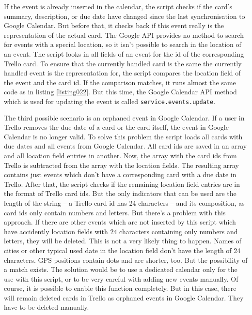 If the event is already inserted in the calendar, the script checks if the card's summary, description, or due date have changed since the last synchronisation to Google Calendar. But before that, it checks back if this event really is the representation of the actual card. The Google API provides no method to search for events with a special location, so it isn't possible to search in the location of an event. The script looks in all fields of an event for the id of the corresponding Trello card. To ensure that the currently handled card is the same the currently handled event is the representation for, the script compares the location field of the event and the card id. If the comparison matches, it runs almost the same code as in listing \ref{listing022}. But this time, the Google Calendar API method which is used for updating the event is called \lstinline{service.events.update}. 

The third possible scenario is an orphaned event in Google Calendar. If a user in Trello removes the due date of a card or the card itself, the event in Google Calendar is no longer valid. To solve this problem the script loads all cards with due dates and all events from Google Calendar. All card ids are saved in an array and all location field entries in another. Now, the array with the card ids from Trello is subtracted from the array with the location fields. The resulting array contains just events which don't have a corresponding card with a due date in Trello. After that, the script checks if the remaining location field entries are in the format of Trello card ids. But the only indicators that can be used are the length of the string – a Trello card id has 24 characters – and its composition, as card ids only contain numbers and letters. But there's a problem with this approach. If there are other events which are not inserted by this script which have accidently location fields with 24 characters containing only numbers and letters, they will be deleted. This is not a very likely thing to happen. Names of cities or other typical used date in the location field don't have the length of 24 characters. GPS positions contain dots and are shorter, too. But the possibility of a match exists. The solution would be to use a dedicated calendar only for the use with this script, or to be very careful with adding new events manually. Of course, it is possible to enable this function completely. But in this case, there will remain deleted cards in Trello as orphaned events in Google Calendar. They have to be deleted manually.

